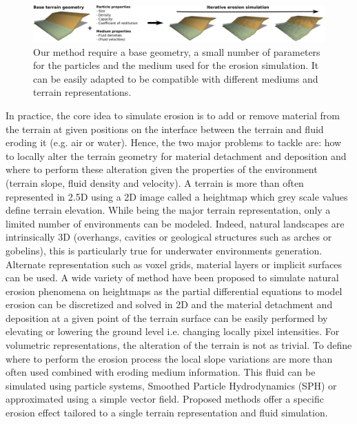 \begin{figure}
\centering
\includegraphics{figures/pipeline.png}
\caption{Our method require a base geometry, a small number of parameters for the particles and the medium used for the erosion simulation. It can be easily adapted to be compatible with different mediums and terrain representations.}
\label{fig:erosion_pipeline}
\end{figure}

In practice, the core idea to simulate erosion is to add or remove material from the terrain at given positions on the interface between the terrain and fluid eroding it (e.g. air or water). Hence, the two major problems to tackle are: how to locally alter the terrain geometry for material detachment and deposition and where to perform these alteration given the properties of the environment (terrain slope, fluid density and velocity).
A terrain is more than often represented in 2.5D using a 2D image called a heightmap which grey scale values define terrain elevation. While being the major terrain representation, only a limited number of environments can be modeled. Indeed, natural landscapes are intrinsically 3D (overhangs, cavities or geological structures such as arches or gobelins), this is particularly true for underwater environments generation. Alternate representation such as voxel grids, material layers or implicit surfaces can be used. A wide variety of method have been proposed to simulate natural erosion phenomena on heightmaps as the partial differential equations to model erosion can be discretized and solved in 2D and the material detachment and deposition at a given point of the terrain surface can be easily performed by elevating or lowering the ground level i.e. changing locally pixel intensities. 
For volumetric representations, the alteration of the terrain is not as trivial.
To define where to perform the erosion process the local slope variations are more than often used combined with eroding medium information. This fluid can be simulated using particle systems, Smoothed Particle Hydrodynamics (SPH) \cite{Kristof2009} or approximated using a simple vector field. 
Proposed methods offer a specific erosion effect tailored to a single terrain representation and fluid simulation.

